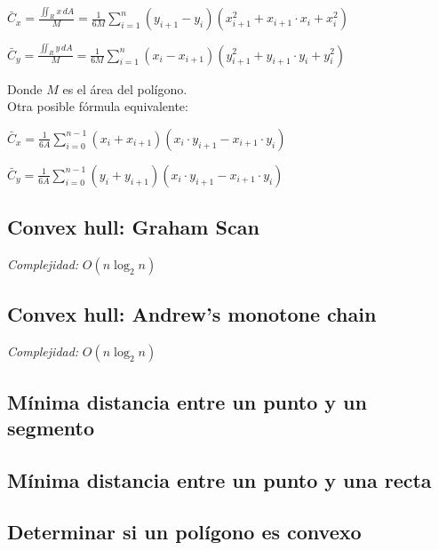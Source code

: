 \documentclass[10pt,letterpaper]{article}
\begin{document}
$ \displaystyle\bar{C}_{x} = \frac{ \displaystyle\iint_{R} x \, dA }{M} = \frac{1}{6M}\sum_{i=1}^{n} (y_{i+1} - y_{i}) (x_{i+1}^2 + x_{i+1} \cdot x_{i} + x_{i}^2) $

\medskip

$\displaystyle\bar{C}_{y} = \frac{ \displaystyle\iint_{R} y \, dA }{M} = \frac{1}{6M} \sum_{i=1}^{n} (x_{i} - x_{i+1}) (y_{i+1}^2 + y_{i+1} \cdot y_{i} + y_{i}^2)$

\medskip

Donde $ M $ es el área del polígono. \\

Otra posible fórmula equivalente:

$ \displaystyle\bar{C}_{x} = \frac{1}{6A} \sum_{i=0}^{n-1} (x_{i} + x_{i+1}) (x_{i} \cdot y_{i+1} - x_{i+1} \cdot y_{i}) $

\medskip

$ \displaystyle\bar{C}_{y} = \frac{1}{6A} \sum_{i=0}^{n-1} (y_{i} + y_{i+1}) (x_{i} \cdot y_{i+1} - x_{i+1} \cdot y_{i}) $


\subsection{Convex hull: Graham Scan}
\emph{Complejidad:} $ O(n \log_{2}{n}) $

\subsection{Convex hull: Andrew's monotone chain}
\emph{Complejidad:} $ O(n \log_{2}{n}) $

\subsection{Mínima distancia entre un punto y un segmento}

\subsection{Mínima distancia entre un punto y una recta}

\subsection{Determinar si un polígono es convexo}
\end{document}
